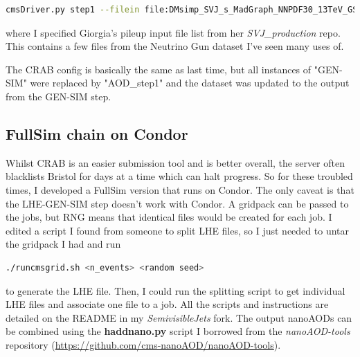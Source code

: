 \begin{lstlisting}[belowskip=-0.7cm, language=sh, numbers=none]
cmsDriver.py step1 --filein file:DMsimp_SVJ_s_MadGraph_NNPDF30_13TeV_GS.root --fileout file:DMsimp_SVJ_s_MadGraph_NNPDF30_13TeV_AOD_step1.root --pileup_input filelist:~/Semi-visible_jets/SVJ_production/global/pileup_filelist.txt --mc --eventcontent PREMIXRAW --datatier GEN-SIM-RAW --conditions 80X_mcRun2_asymptotic_2016_TrancheIV_v6 --step DIGIPREMIX_S2,DATAMIX,L1,DIGI2RAW,HLT:@frozen2016 --datamix PreMix --era Run2_2016 --python_filename DMsimp_SVJ_s_MadGraph_NNPDF_13TeV_AOD_step1.py --no_exec --customise Configuration/DataProcessing/Utils.addMonitoring -n 50000
\end{lstlisting}

where I specified Giorgia's pileup input file list from her \emph{SVJ\_production} repo. This contains a few files from the Neutrino Gun dataset I've seen many uses of.

The CRAB config is basically the same as last time, but all instances of "GEN-SIM" were replaced by "AOD\_step1" and the dataset was updated to the output from the GEN-SIM step.




\subsection{FullSim chain on Condor}

Whilst CRAB is an easier submission tool and is better overall, the server often blacklists Bristol for days at a time which can halt progress. So for these troubled times, I developed a FullSim version that runs on Condor. The only caveat is that the LHE-GEN-SIM step doesn't work with Condor. A gridpack can be passed to the jobs, but RNG means that identical files would be created for each job. I edited a script I found from someone to split LHE files, so I just needed to untar the gridpack I had and run

\begin{lstlisting}[belowskip=-0.7cm, language=sh, numbers=none]
./runcmsgrid.sh <n_events> <random seed>
\end{lstlisting}

to generate the LHE file. Then, I could run the splitting script to get individual LHE files and associate one file to a job. All the scripts and instructions are detailed on the README in my \emph{SemivisibleJets} fork. The output nanoAODs can be combined using the \textbf{haddnano.py} script I borrowed from the \emph{nanoAOD-tools} repository (\url{https://github.com/cms-nanoAOD/nanoAOD-tools}).

